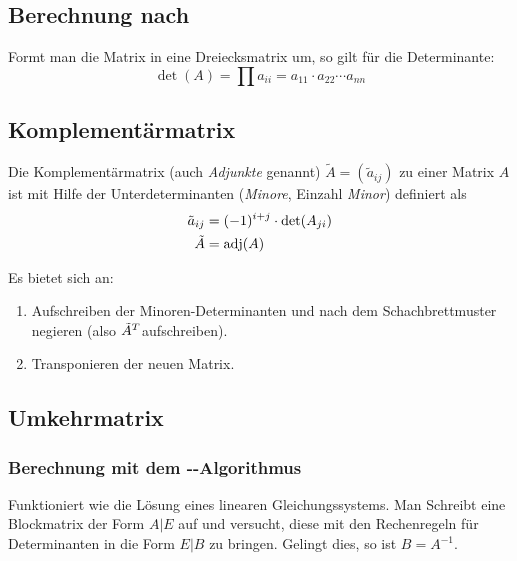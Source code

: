 \subsection{Berechnung nach \protect{}}

Formt man die Matrix in eine Dreiecksmatrix um, so gilt für die Determinante:
\[ \det(A) = \prod a_{ii} = a_{11} \cdot a_{22} \cdots a_{nn} \]



\subsection{Komplementärmatrix}

Die Komplementärmatrix (auch \emph{Adjunkte} genannt) $\tilde{A}=(\tilde{a}_{ij})$ zu einer Matrix $A$ ist mit Hilfe der Unterdeterminanten (\emph{Minore}, Einzahl \emph{Minor}) definiert als
\begin{align*}
  \tilde{a}_{ij} & =(-1)^{i+j}\cdot\det(A_{ji})\\
  \tilde{A}      & =\operatorname{adj}(A)
\end{align*}


Es bietet sich an:
\begin{enumerate}
  \item Aufschreiben der Minoren-Determinanten und nach dem Schachbrettmuster negieren (also $\tilde A\t$ aufschreiben).
  \item Transponieren der neuen Matrix.
\end{enumerate}

\subsection{Umkehrmatrix}



\subsubsection[\protect\noun{Gauß}-\protect\noun{Jordan}-Algorithmus]{Berechnung mit dem \protect{}-\protect{}-Algorithmus}

Funktioniert wie die Lösung eines linearen Gleichungssystems.
Man Schreibt eine Blockmatrix der Form $A|E$ auf und versucht, diese mit den Rechenregeln für Determinanten in die Form $E|B$ zu bringen.
Gelingt dies, so ist $B=A^{-1}$.


